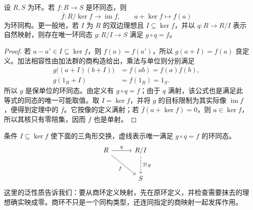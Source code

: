 \begin{theorem}[环的第一同构定理]\label{b1:thm:ring-first-iso}
	设 \(R,S\) 为环。若 \(f:R\rightarrow S\) 是环同态，则
	\[
		\overline f:R/\ker f\longrightarrow\operatorname{im}f, \qquad a+\ker f\longmapsto f(a)
	\]
	为环同构。更一般地，若 \(I\) 为 \(R\) 的双边理想且 \(I\subseteq\ker f\)，并以 \(q:R\rightarrow R/I\) 表示自然映射，则存在唯一环同态 \(g:R/I\rightarrow S\) 满足 \(g\circ q=f\)。
\end{theorem}
\begin{proof}
	若 \(a-a'\in I\subseteq\ker f\)，则 \(f(a)=f(a')\)，所以 \(g(a+I)=f(a)\) 良定义。加法相容性由加法群的商构造给出，乘法与单位则分别满足
	\[
		\begin{aligned}
			g\bigl((a+I)(b+I)\bigr)&=f(ab)=f(a)f(b),\\
			g(1_R+I)&=f(1_R)=1_S.
		\end{aligned}
	\]
	所以 \(g\) 是保单位的环同态。由定义有 \(g\circ q=f\)；由于 \(q\) 满射，该公式也是满足此等式的同态的唯一可能取值。取 \(I=\ker f\)，并将 \(g\) 的目标限制为其实际像 \(\operatorname{im}f\)，便得到定理中的 \(\overline f\)。它按像的定义满射；若 \(\overline f(a+\ker f)=0\)，则 \(a\in\ker f\)，所以其核只有零陪集，因而 \(\overline f\) 也是单射。
\end{proof}
条件 \(I\subseteq\ker f\) 使下面的三角形交换，虚线表示唯一满足 \(g\circ q=f\) 的环同态。
\[
	\begin{tikzcd}[column sep=3em,row sep=2.5em]
		R\arrow[r,"q"]\arrow[dr,"f"']&R/I\arrow[d,dashed,"\exists!\,g"]\\
		&S
	\end{tikzcd}
\]
这里的泛性质告诉我们：要从商环定义映射，先在原环定义，并检查需要抹去的理想确实映成零。商环不只是一个同构类型，还连同指定的商映射一起发挥作用。

